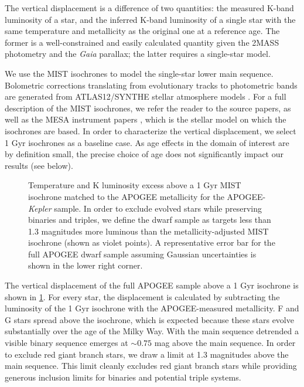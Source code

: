 \documentclass[manuscript]{aastex6}
\newcommand{\Kepler}{\mbox{\textit{Kepler}}}
\newcommand{\Gaia}{\mbox{\textit{Gaia}}}
\begin{document}
The vertical displacement is a difference of two quantities: the measured 
K-band luminosity of a star, and the inferred K-band luminosity of a single 
star with the same temperature and metallicity as the original one at a reference age. The 
former is a well-constrained and easily calculated quantity given the 2MASS 
photometry and the \Gaia{} parallax; the latter requires a single-star model.

We use the MIST \citep{Dotter16,Choi16} isochrones to model the 
single-star lower main sequence. Bolometric corrections translating from
evolutionary tracks to photometric bands are generated from ATLAS12/SYNTHE
stellar atmosphere models \citep{Kurucz70,Kurucz93}. For a full description of the MIST isochrones, we 
refer the reader to the source papers, as well as the MESA instrument papers 
\citep{Paxton11, Paxton13, Paxton15}, which is the stellar model on which the 
isochrones are based. In order to characterize the vertical displacement, we select 1 Gyr isochrones
as a baseline case. As age effects in the domain of interest are by definition
small, the precise choice of age does not significantly impact our results (see
below).

\begin{figure}[htb]
    \centering
    \caption{Temperature and K luminosity excess above a 1 Gyr MIST isochrone 
        matched to the APOGEE metallicity for the APOGEE-\Kepler{} sample. 
        In order to exclude evolved stars while preserving binaries and
        triples, we define the dwarf sample as targets less than 1.3 magnitudes
        more luminous than the metallicity-adjusted MIST isochrone (shown as
        violet points). A representative error bar for the 
        full APOGEE dwarf sample assuming Gaussian uncertainties is shown in 
        the lower right corner.}\label{fig:sample_dk}
\end{figure}


The vertical displacement of the full APOGEE sample above a 1 Gyr isochrone is 
shown in \cref{fig:sample_dk}. For every star, the displacement is calculated 
by subtracting the luminosity of the 1 Gyr isochrone with the APOGEE-measured 
metallicity. F and G stars spread above the isochrone, which is 
expected because these stars evolve substantially over the age of the Milky
Way. With the main sequence detrended a visible binary sequence emerges at 
\(\sim0.75\) mag above the main sequence. In order to exclude red 
giant branch stars, we draw a limit at 1.3 magnitudes above the main sequence. 
This limit cleanly excludes red giant branch stars while providing generous 
inclusion limits for binaries and potential triple systems.
\end{document}
